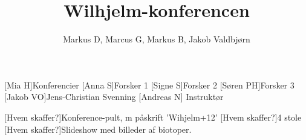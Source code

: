 \documentclass[a4paper,12pt]{article}
\title{Wilhjelm-konferencen}
\author{Markus D, Marcus G, Markus B, Jakob Valdbjørn}
\begin{document}
\maketitle




\begin{roles}
	[Mia H]Konferencier
	[Anna S]Forsker 1
	[Signe S]Forsker 2
	[Søren PH]Forsker 3
	[Jakob VO]Jens-Christian Svenning
	[Andreas N] Instruktør
\end{roles}


\begin{props}
	[Hvem skaffer?]Konference-pult, m påskrift 'Wihjelm+12'
	[Hvem skaffer?]4 stole
	[Hvem skaffer?]Slideshow med billeder af biotoper.
\end{props}
\end{document}
